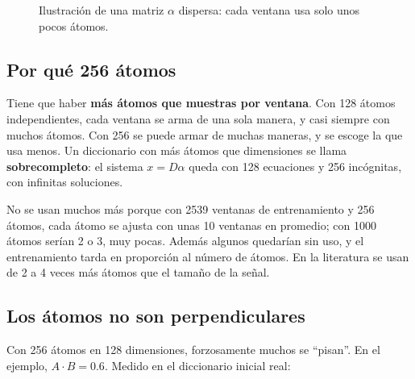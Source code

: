 \documentclass[11pt,letterpaper]{article}
\begin{document}
\begin{figure}[H]
\centering
{}
\caption{Ilustración de una matriz $\alpha$ dispersa: cada ventana usa
solo unos pocos átomos.}
\label{fig:disperso}
\end{figure}

\subsection*{Por qué 256 átomos}

Tiene que haber \textbf{más átomos que muestras por ventana}. Con 128
átomos independientes, cada ventana se arma de una sola manera, y casi
siempre con muchos átomos. Con 256 se puede armar de muchas maneras, y
se escoge la que usa menos. Un diccionario con más átomos que
dimensiones se llama \textbf{sobrecompleto}: el sistema $x = D\alpha$
queda con 128 ecuaciones y 256 incógnitas, con infinitas soluciones.

No se usan muchos más porque con 2539 ventanas de entrenamiento y 256
átomos, cada átomo se ajusta con unas 10 ventanas en promedio; con 1000
átomos serían 2 o 3, muy pocas. Además algunos quedarían sin uso, y el
entrenamiento tarda en proporción al número de átomos. En la literatura
se usan de 2 a 4 veces más átomos que el tamaño de la señal.

\subsection*{Los átomos no son perpendiculares}

Con 256 átomos en 128 dimensiones, forzosamente muchos se ``pisan''. En
el ejemplo, $A \cdot B = 0.6$. Medido en el diccionario inicial real:
\end{document}
